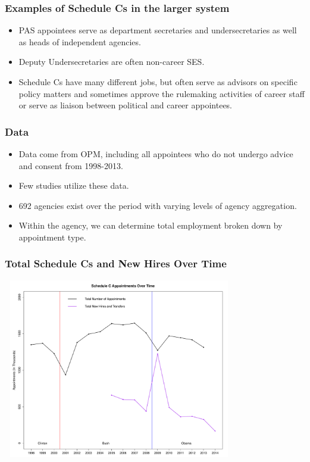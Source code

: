\documentclass{beamer}
\begin{document}
\begin{frame}
\frametitle{Examples of Schedule Cs in the larger system}
\begin{itemize}\addtolength{\itemsep}{1.5\baselineskip}
\item PAS appointees serve as department secretaries and undersecretaries as well as heads of independent agencies.
\item Deputy Undersecretaries are often non-career SES. 
\item Schedule Cs have many different jobs, but often serve as advisors on specific policy matters and sometimes approve the rulemaking activities of career staff or serve as liaison between political and career appointees.
\end{itemize}
\hfill%
\end{frame}


\begin{frame}
\frametitle{Data}
\begin{itemize} \addtolength{\itemsep}{1.5\baselineskip}
\item Data come from OPM, including all appointees who do not undergo advice and consent from 1998-2013.
\item Few studies utilize these data.
\item 692 agencies exist over the period with varying levels of agency aggregation. 
\item Within the agency, we can determine total employment broken down by appointment type. 
\end{itemize}
\end{frame}

\begin{frame}
\frametitle{Total Schedule Cs and New Hires Over Time}
\centering
\includegraphics[height=3.1in,width=4in]{SCAptsandAccOverTime.pdf}
\end{frame}
\end{document}
